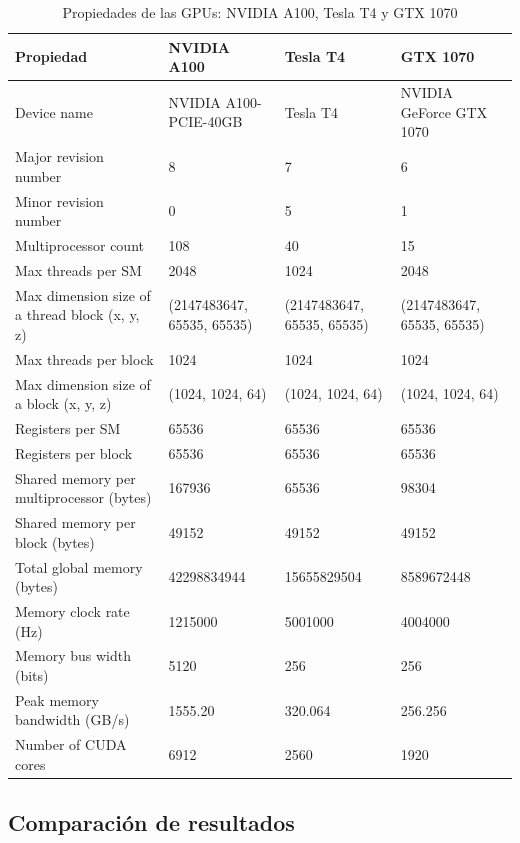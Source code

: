 \documentclass{article}
\begin{document}
		\begin{table}[H]
			\begin{adjustbox}{width=\textwidth, keepaspectratio}
				\begin{tabular}{|l|l|l|l|}
					\hline
					\textbf{Propiedad} & \textbf{NVIDIA A100} & \textbf{Tesla T4} & \textbf{GTX 1070} \\ \hline
					Device name & NVIDIA A100-PCIE-40GB & Tesla T4 & NVIDIA GeForce GTX 1070 \\ \hline
					Major revision number & 8 & 7 & 6 \\ \hline
					Minor revision number & 0 & 5 & 1 \\ \hline
					Multiprocessor count & 108 & 40 & 15 \\ \hline
					Max threads per SM & 2048 & 1024 & 2048 \\ \hline
					Max dimension size of a thread block (x, y, z) & (2147483647, 65535, 65535) & (2147483647, 65535, 65535) & (2147483647, 65535, 65535) \\ \hline
					Max threads per block & 1024 & 1024 & 1024 \\ \hline
					Max dimension size of a block (x, y, z) & (1024, 1024, 64) & (1024, 1024, 64) & (1024, 1024, 64) \\ \hline
					Registers per SM & 65536 & 65536 & 65536 \\ \hline
					Registers per block & 65536 & 65536 & 65536 \\ \hline
					Shared memory per multiprocessor (bytes) & 167936 & 65536 & 98304 \\ \hline
					Shared memory per block (bytes) & 49152 & 49152 & 49152 \\ \hline
					Total global memory (bytes) & 42298834944 & 15655829504 & 8589672448 \\ \hline
					Memory clock rate (Hz) & 1215000 & 5001000 & 4004000 \\ \hline
					Memory bus width (bits) & 5120 & 256 & 256 \\ \hline
					Peak memory bandwidth (GB/s) & 1555.20 & 320.064 & 256.256 \\ \hline
					Number of CUDA cores & 6912 & 2560 & 1920 \\ \hline
				\end{tabular}
			\end{adjustbox}
			\centering
			\caption{Propiedades de las GPUs: NVIDIA A100, Tesla T4 y GTX 1070}
		\end{table}

	\subsection{Comparación de resultados}
\end{document}
